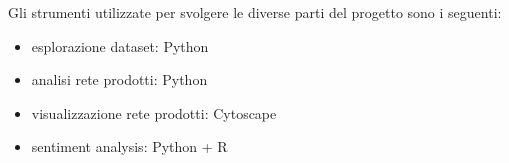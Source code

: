 Gli strumenti utilizzate per svolgere le diverse parti del progetto sono i seguenti:
\begin{itemize}
    \item esplorazione dataset: Python
    \item analisi rete prodotti: Python
    \item visualizzazione rete prodotti: Cytoscape
    \item sentiment analysis: Python + R
\end{itemize}